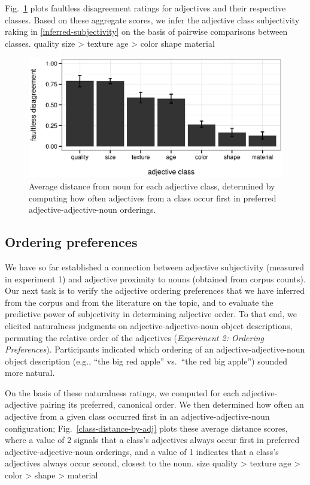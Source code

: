 \documentclass{pnastwo}
\begin{document}
\begin{article}
Fig.~\ref{faultless-class} plots faultless disagreement ratings for adjectives and their respective classes. Based on these aggregate scores, we infer the adjective class subjectivity raking in \ref{inferred-subjectivity} on the basis of pairwise comparisons between classes.
\be quality \geq size > texture \geq age > color \geq shape \geq material \label{inferred-subjectivity}\ee

\begin{figure}[h]
	\centering
	\includegraphics[width=.95\linewidth]{plots/faultless_class_plot.eps}
	\caption{Average distance from noun for each adjective class, determined by computing how often adjectives from a class occur first in preferred adjective-adjective-noun orderings.}\label{faultless-class}
\end{figure}


\subsection{Ordering preferences}
We have so far established a connection between adjective subjectivity (measured in experiment 1) and adjective proximity to nouns (obtained from corpus counts). Our next task is to verify the adjective ordering preferences that we have inferred from the corpus and from the literature on the topic, and to evaluate the predictive power of subjectivity in determining adjective order. To that end, we elicited naturalness judgments on adjective-adjective-noun object descriptions, permuting the relative order of the adjectives (\emph{Experiment 2: Ordering Preferences}). Participants indicated which ordering of an adjective-adjective-noun object description (e.g., ``the big red apple'' vs.\ ``the red big apple'') sounded more natural. 

On the basis of these naturalness ratings, we computed for each adjective-adjective pairing its preferred, canonical order. We then determined how often an adjective from a given class occurred first in an adjective-adjective-noun configuration; Fig.\ \ref{class-distance-by-adj} plots these average distance scores, where a value of 2 signals that a class's adjectives always occur first in preferred adjective-adjective-noun orderings, and a value of 1 indicates that a class's adjectives always occur second, closest to the noun.
\be size \geq quality > texture \geq age > color > shape > material \label{inferred-preference}\ee


\end{article}
\end{document}
